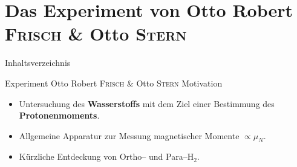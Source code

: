 \documentclass[t,9pt]{beamer}
\newcommand{\highlight}[3]{ \begin{textblock*}{#1}(#2,#3) \begin{tcolorbox} [enhanced,opacityfill=.1,colback=blue] \end{tcolorbox} \end{textblock*} } %
\begin{document}
        \section{Das Experiment von Otto Robert \textsc{Frisch} \& Otto \textsc{Stern}} 

        \begin{frame}{Inhaltsverzeichnis}
                \tableofcontents[currentsection]
        \end{frame}


        \begin{frame}{Experiment Otto Robert \textsc{Frisch} \& Otto \textsc{Stern}}
                Motivation
                \begin{itemize}
                        \item Untersuchung des \textbf{Wasserstoffs} mit dem Ziel einer Bestimmung des \textbf{Protonenmoments}. %
                        \item Allgemeine Apparatur zur Messung magnetischer Momente $\propto \mu _N$.
                        \item Kürzliche Entdeckung von Ortho-- und Para--$\text{H}_2$.
                \end{itemize}
                \hfill\tiny\cite{FrischStern1933}\normalsize
        \end{frame}

\end{document}
